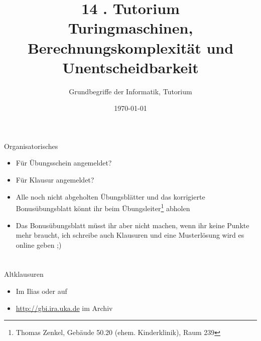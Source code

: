 




\usetikzlibrary{matrix}
\usetikzlibrary{arrows.meta}
\usetikzlibrary{automata}
\usetikzlibrary{tikzmark}

\title[Turingmaschinen]{14 . Tutorium\\ Turingmaschinen, Berechnungskomplexität und Unentscheidbarkeit}
\subtitle{Grundbegriffe der Informatik, Tutorium \mytutnumber}
\date{\today}


\titleframe

\begin{frame}{Organisatorisches}
	\begin{itemize}
		\item Für Übungsschein angemeldet?
		\item Für Klausur angemeldet?
		\item Alle noch nicht abgeholten Übungsblätter und das korrigierte Bonusübungsblatt könnt ihr beim Übungsleiter\footnote{Thomas Zenkel, Gebäude 50.20 (ehem. Kinderklinik), Raum 239} abholen
	    \item<handout:0> Das Bonusübungsblatt müsst ihr aber nicht machen, wenn ihr keine Punkte mehr braucht, ich schreibe auch Klausuren und eine Musterlösung wird es online geben ;)
	\end{itemize}
\end{frame}

\roadmap


\def\parfunc{\dashedrightarrow}



\section{}

\begin{frame}{Altklausuren}
    \begin{itemize}
    	\item Im Ilias oder auf 
    	\item \url{http://gbi.ira.uka.de} im Archiv
    \end{itemize}
\end{frame}

